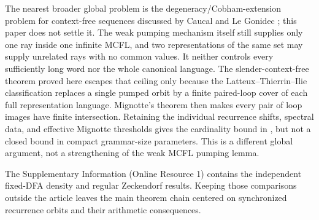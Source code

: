 The nearest broader global problem is the degeneracy/Cobham-extension
problem for context-free sequences discussed by Caucal and Le Gonidec
\cite{CaucalLeGonidec2014}; this paper does not settle it. The weak pumping
mechanism itself still supplies only one ray inside one infinite MCFL, and
two representations of the same set may supply unrelated rays with no
common values. It neither controls every sufficiently long word nor the
whole canonical language. The slender-context-free theorem proved here
escapes that ceiling only because the Latteux--Thierrin--Ilie
classification replaces a single pumped orbit by a finite paired-loop cover
of each full representation language. Mignotte's theorem then makes every
pair of loop images have finite intersection. Retaining the individual
recurrence shifts, spectral data, and effective Mignotte thresholds gives the
cardinality bound in , but not a
closed bound in compact grammar-size parameters. This is a different global
argument, not a strengthening of the weak MCFL pumping lemma.

The Supplementary Information (Online Resource 1) contains the independent fixed-DFA density and
regular Zeckendorf results. Keeping those comparisons outside the article
leaves the main theorem chain centered on synchronized recurrence orbits
and their arithmetic consequences.
